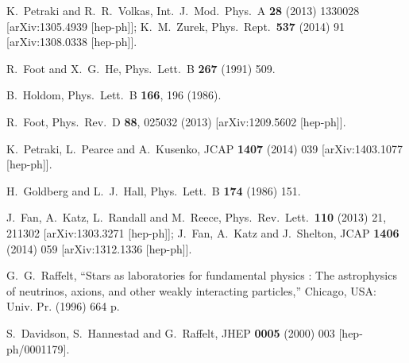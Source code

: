 \documentclass[12pt]{article}
\begin{document}
{{\begin{thebibliography}{999}
  K.~Petraki and R.~R.~Volkas,
  Int.\ J.\ Mod.\ Phys.\ A {\bf 28} (2013) 1330028
  [arXiv:1305.4939 [hep-ph]];
  K.~M.~Zurek,
  Phys.\ Rept.\  {\bf 537} (2014) 91
  [arXiv:1308.0338 [hep-ph]].
  
  R.~Foot and X.~G.~He,
  Phys.\ Lett.\ B {\bf 267} (1991) 509.
  
  B.~Holdom,
  Phys.\ Lett.\ B {\bf 166}, 196 (1986).
  
  R.~Foot,
  Phys.\ Rev.\ D {\bf 88}, 025032 (2013)
  [arXiv:1209.5602 [hep-ph]].
  
  K.~Petraki, L.~Pearce and A.~Kusenko,
  JCAP {\bf 1407} (2014) 039
  [arXiv:1403.1077 [hep-ph]].
  
  H.~Goldberg and L.~J.~Hall,
  Phys.\ Lett.\ B {\bf 174} (1986) 151.
  
  J.~Fan, A.~Katz, L.~Randall and M.~Reece,
  Phys.\ Rev.\ Lett.\  {\bf 110} (2013) 21,  211302
  [arXiv:1303.3271 [hep-ph]];
  J.~Fan, A.~Katz and J.~Shelton,
  JCAP {\bf 1406} (2014) 059
  [arXiv:1312.1336 [hep-ph]].

  G.~G.~Raffelt,
  ``Stars as laboratories for fundamental physics : The astrophysics of
neutrinos, axions, and other weakly interacting particles,''
  Chicago, USA: Univ. Pr. (1996) 664 p.

  S.~Davidson, S.~Hannestad and G.~Raffelt,
  JHEP {\bf 0005} (2000) 003
  [hep-ph/0001179].


\end{thebibliography}}}
\end{document}
